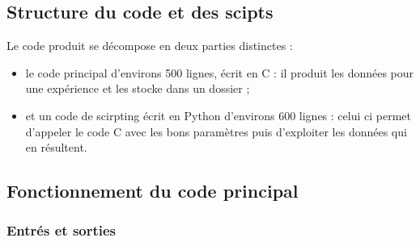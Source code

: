 \documentclass[a4paper, 11pt]{article}
\begin{document}
\subsection{Structure du code et des scipts}

Le code produit se décompose en deux parties distinctes :
\begin{itemize}
    \item le code principal d'environs 500 lignes, écrit en C  : il produit les données pour une expérience
        et les stocke dans un dossier ;
    \item et un code de scirpting écrit en Python d'environs 600 lignes : celui ci permet d'appeler le code C avec
        les bons paramètres puis d'exploiter les données qui en résultent.
\end{itemize}

\subsection{Fonctionnement du code principal}

\subsubsection{Entrés et sorties}
\end{document}
